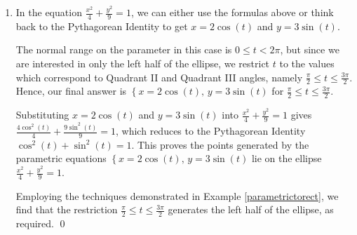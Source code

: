 \documentclass{ximera}
\begin{document}
\begin{example}
\begin{explanation}
\begin{enumerate}
\[ \begin{array}{rcl}

x^2 + 2x + y^2 - 4y & = & 4  \\
(-1+3\cos(t))^2 + 2(-1+3\cos(t)) + (2+3\sin(t))^2 - 4(2+3\sin(t)) & \stackrel{\text{?}}{=} & 4  \\
1  - 6\cos(t) + 9\cos^{2}(t) - 2 + 6\cos(t) + 4 + 12\sin(t) + 9\sin^{2}(t) - 8 - 12\sin(t) & \stackrel{\text{?}}{=} & 4  \\
9\cos^{2}(t) + 9\sin^{2}(t) -5 & \stackrel{\text{?}}{=} & 4 \\
9\left(\cos^{2}(t) + \sin^{2}(t)\right) -5 & \stackrel{\text{?}}{=} & 4  \\
9\left(1\right) -5 & \stackrel{\text{?}}{=} & 4 \\
4 & = & 4 \, \checkmark   \\ \end{array} \]

Now that we know the parametric equations give us points on the circle, we can go through the usual analysis as demonstrated in Example \ref{parametrictorect}  to show that the entire circle is covered as $t$ ranges through the interval $[0,2\pi)$.

\item  In the equation $\frac{x^2}{4} + \frac{y^2}{9} = 1$, we can either use the formulas above or think back to the Pythagorean Identity to get  $x = 2\cos(t)$ and $y = 3\sin(t)$.  

 

The normal range on the parameter in this case is $0 \leq t < 2\pi$, but since we are interested in only the left half of the ellipse, we restrict $t$ to the values which correspond to Quadrant II and Quadrant III angles, namely  $\frac{\pi}{2} \leq t \leq \frac{3\pi}{2}$.   Hence, our final answer is $\left\{  x = 2\cos(t), \,   y = 3\sin(t) \right.$ for $\frac{\pi}{2} \leq t \leq \frac{3\pi}{2}$.  

 

Substituting $x = 2\cos(t)$ and $y = 3\sin(t)$ into  $\frac{x^2}{4} + \frac{y^2}{9} = 1$ gives $\frac{4\cos^{2}(t)}{4} + \frac{9 \sin^{2}(t)}{9} = 1$, which reduces to the Pythagorean Identity $\cos^{2}(t) + \sin^{2}(t) = 1$.  This proves the points generated by the parametric equations  $\left\{  x = 2\cos(t), \,   y = 3\sin(t) \right.$ lie on the ellipse $\frac{x^2}{4} + \frac{y^2}{9} = 1$. 

 

 Employing the techniques demonstrated in Example \ref{parametrictorect}, we find that the restriction $\frac{\pi}{2} \leq t \leq \frac{3\pi}{2}$ generates the left half of the ellipse, as required.  \qed

\end{enumerate}
\end{explanation}
\end{example}
\end{document}
